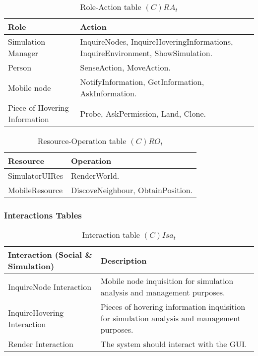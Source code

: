 \begin{table}[H]
	\centering
	\begin{tabular}{|p{4cm}|p{8cm}|}
			\hline
			\textbf{Role} & \textbf{Action} \\
			\hline
      Simulation Manager & InquireNodes, InquireHoveringInformations,
      InquireEnvironment, ShowSimulation. \\
			\hline
			Person & SenseAction, MoveAction. \\
			\hline
			Mobile node & NotifyInformation, GetInformation, AskInformation.  \\
			\hline
			Piece of Hovering Information & Probe, AskPermission, Land, Clone. \\
			\hline
		\end{tabular}
	\caption{Role-Action table $(C)RA_t$}
	\label{tab:rat}
\end{table}

\begin{table}[H]
	\centering
	\begin{tabular}{|p{4cm}|p{8cm}|}
			\hline
			\textbf{Resource} & \textbf{Operation} \\
			\hline
			SimulatorUIRes & RenderWorld. \\
			\hline
			MobileResource & DiscoveNeighbour, ObtainPosition. \\
			\hline
		\end{tabular}
	\caption{Resource-Operation table $(C)RO_t$}
	\label{tab:crot}
\end{table}

\subsubsection{Interactions Tables}

\begin{table}[H]
	\centering
	\begin{tabular}{|p{4cm}|p{8cm}|}
			\hline
			\textbf{Interaction (Social \& Simulation)} & \textbf{Description} \\
			\hline
			InquireNode Interaction & Mobile node inquisition for simulation analysis and
			management purposes. \\
			\hline
      InquireHovering Interaction & Pieces of hovering information inquisition
      for simulation analysis and management purposes. \\
			\hline
			Render Interaction & The system should interact with the GUI. \\
			\hline
		\end{tabular}
	\caption{Interaction table $(C)Isa_t$}
	\label{tab:cisat}
\end{table}


